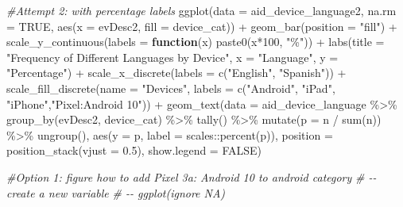 \documentclass[
]{article}
\newenvironment{Shaded}{\begin{snugshade}}{\end{snugshade}}
\newcommand{\AttributeTok}[1]{\textcolor[rgb]{0.77,0.63,0.00}{#1}}
\newcommand{\CommentTok}[1]{\textcolor[rgb]{0.56,0.35,0.01}{\textit{#1}}}
\newcommand{\ConstantTok}[1]{\textcolor[rgb]{0.00,0.00,0.00}{#1}}
\newcommand{\ControlFlowTok}[1]{\textcolor[rgb]{0.13,0.29,0.53}{\textbf{#1}}}
\newcommand{\DecValTok}[1]{\textcolor[rgb]{0.00,0.00,0.81}{#1}}
\newcommand{\FloatTok}[1]{\textcolor[rgb]{0.00,0.00,0.81}{#1}}
\newcommand{\FunctionTok}[1]{\textcolor[rgb]{0.00,0.00,0.00}{#1}}
\newcommand{\NormalTok}[1]{#1}
\newcommand{\SpecialCharTok}[1]{\textcolor[rgb]{0.00,0.00,0.00}{#1}}
\newcommand{\StringTok}[1]{\textcolor[rgb]{0.31,0.60,0.02}{#1}}
\begin{document}
\begin{Shaded}
\begin{Highlighting}[]
\CommentTok{\#Attempt 2: with percentage labels }
\FunctionTok{ggplot}\NormalTok{(}\AttributeTok{data =}\NormalTok{ aid\_device\_language2, }\AttributeTok{na.rm =} \ConstantTok{TRUE}\NormalTok{, }\FunctionTok{aes}\NormalTok{(}\AttributeTok{x =}\NormalTok{ evDesc2, }\AttributeTok{fill =}\NormalTok{ device\_cat)) }\SpecialCharTok{+} 
  \FunctionTok{geom\_bar}\NormalTok{(}\AttributeTok{position =} \StringTok{"fill"}\NormalTok{) }\SpecialCharTok{+} 
  \FunctionTok{scale\_y\_continuous}\NormalTok{(}\AttributeTok{labels =} \ControlFlowTok{function}\NormalTok{(x) }\FunctionTok{paste0}\NormalTok{(x}\SpecialCharTok{*}\DecValTok{100}\NormalTok{, }\StringTok{"\%"}\NormalTok{)) }\SpecialCharTok{+} 
   \FunctionTok{labs}\NormalTok{(}\AttributeTok{title =} \StringTok{"Frequency of Different Languages by Device"}\NormalTok{, }
       \AttributeTok{x =} \StringTok{"Language"}\NormalTok{, }
       \AttributeTok{y =} \StringTok{"Percentage"}\NormalTok{) }\SpecialCharTok{+}
      \FunctionTok{scale\_x\_discrete}\NormalTok{(}\AttributeTok{labels =} \FunctionTok{c}\NormalTok{(}\StringTok{"English"}\NormalTok{, }\StringTok{"Spanish"}\NormalTok{)) }\SpecialCharTok{+} 
      \FunctionTok{scale\_fill\_discrete}\NormalTok{(}\AttributeTok{name =} \StringTok{"Devices"}\NormalTok{, }\AttributeTok{labels =} \FunctionTok{c}\NormalTok{(}\StringTok{"Android"}\NormalTok{, }\StringTok{"iPad"}\NormalTok{, }\StringTok{"iPhone"}\NormalTok{,}\StringTok{"Pixel:Android 10"}\NormalTok{)) }\SpecialCharTok{+}     
        \FunctionTok{geom\_text}\NormalTok{(}\AttributeTok{data =}\NormalTok{ aid\_device\_language }\SpecialCharTok{\%\textgreater{}\%} 
              \FunctionTok{group\_by}\NormalTok{(evDesc2, device\_cat) }\SpecialCharTok{\%\textgreater{}\%}
              \FunctionTok{tally}\NormalTok{() }\SpecialCharTok{\%\textgreater{}\%}
              \FunctionTok{mutate}\NormalTok{(}\AttributeTok{p =}\NormalTok{ n }\SpecialCharTok{/} \FunctionTok{sum}\NormalTok{(n)) }\SpecialCharTok{\%\textgreater{}\%}
              \FunctionTok{ungroup}\NormalTok{(),}
            \FunctionTok{aes}\NormalTok{(}\AttributeTok{y =}\NormalTok{ p, }\AttributeTok{label =}\NormalTok{ scales}\SpecialCharTok{::}\FunctionTok{percent}\NormalTok{(p)),}
            \AttributeTok{position =} \FunctionTok{position\_stack}\NormalTok{(}\AttributeTok{vjust =} \FloatTok{0.5}\NormalTok{),}
            \AttributeTok{show.legend =} \ConstantTok{FALSE}\NormalTok{)}
            
\CommentTok{\#Option 1: figure how to add \textquotesingle{}Pixel 3a: Android 10\textquotesingle{} to android category }
\CommentTok{\# {-}{-} create a new variable}
\CommentTok{\# {-}{-} ggplot(ignore NA)}


\end{Highlighting}
\end{Shaded}
\end{document}
